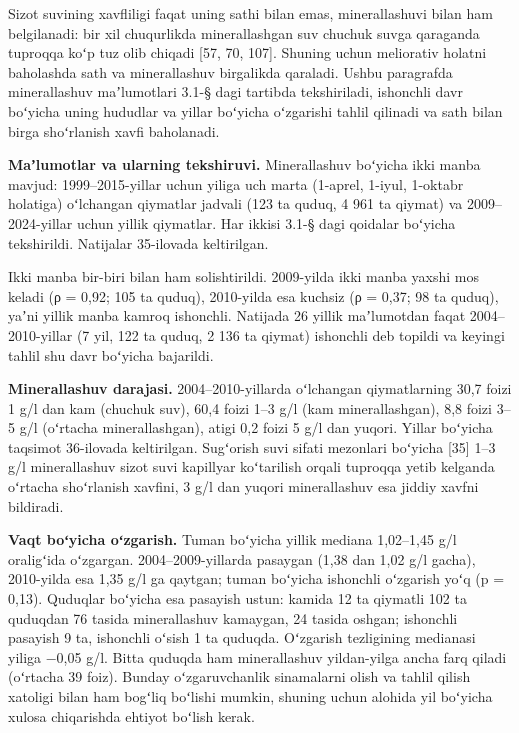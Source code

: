 
Sizot suvining xavfliligi faqat uning sathi bilan emas, minerallashuvi
bilan ham belgilanadi: bir xil chuqurlikda minerallashgan suv chuchuk
suvga qaraganda tuproqqa koʻp tuz olib chiqadi {[}57, 70, 107{]}.
Shuning uchun meliorativ holatni baholashda sath va minerallashuv
birgalikda qaraladi. Ushbu paragrafda minerallashuv maʼlumotlari 3.1-§
dagi tartibda tekshiriladi, ishonchli davr boʻyicha uning hududlar va
yillar boʻyicha oʻzgarishi tahlil qilinadi va sath bilan birga
shoʻrlanish xavfi baholanadi.

\textbf{Maʼlumotlar va ularning tekshiruvi.} Minerallashuv boʻyicha ikki
manba mavjud: 1999--2015-yillar uchun yiliga uch marta (1-aprel, 1-iyul,
1-oktabr holatiga) oʻlchangan qiymatlar jadvali (123 ta quduq, 4 961 ta
qiymat) va 2009--2024-yillar uchun yillik qiymatlar. Har ikkisi 3.1-§
dagi qoidalar boʻyicha tekshirildi. Natijalar 35-ilovada keltirilgan.

Ikki manba bir-biri bilan ham solishtirildi. 2009-yilda ikki manba
yaxshi mos keladi (ρ = 0,92; 105 ta quduq), 2010-yilda esa kuchsiz (ρ =
0,37; 98 ta quduq), yaʼni yillik manba kamroq ishonchli. Natijada 26
yillik maʼlumotdan faqat 2004--2010-yillar (7 yil, 122 ta quduq, 2 136
ta qiymat) ishonchli deb topildi va keyingi tahlil shu davr boʻyicha
bajarildi.

\textbf{Minerallashuv darajasi.} 2004--2010-yillarda oʻlchangan
qiymatlarning 30,7 foizi 1 g/l dan kam (chuchuk suv), 60,4 foizi 1--3
g/l (kam minerallashgan), 8,8 foizi 3--5 g/l (oʻrtacha minerallashgan),
atigi 0,2 foizi 5 g/l dan yuqori. Yillar boʻyicha taqsimot 36-ilovada
keltirilgan. Sugʻorish suvi sifati mezonlari boʻyicha {[}35{]} 1--3 g/l
minerallashuv sizot suvi kapillyar koʻtarilish orqali tuproqqa yetib
kelganda oʻrtacha shoʻrlanish xavfini, 3 g/l dan yuqori minerallashuv
esa jiddiy xavfni bildiradi.

\textbf{Vaqt boʻyicha oʻzgarish.} Tuman boʻyicha yillik mediana
1,02--1,45 g/l oraligʻida oʻzgargan. 2004--2009-yillarda pasaygan (1,38
dan 1,02 g/l gacha), 2010-yilda esa 1,35 g/l ga qaytgan; tuman boʻyicha
ishonchli oʻzgarish yoʻq (p = 0,13). Quduqlar boʻyicha esa pasayish
ustun: kamida 12 ta qiymatli 102 ta quduqdan 76 tasida minerallashuv
kamaygan, 24 tasida oshgan; ishonchli pasayish 9 ta, ishonchli oʻsish 1
ta quduqda. Oʻzgarish tezligining medianasi yiliga −0,05 g/l. Bitta
quduqda ham minerallashuv yildan-yilga ancha farq qiladi (oʻrtacha 39
foiz). Bunday oʻzgaruvchanlik sinamalarni olish va tahlil qilish
xatoligi bilan ham bogʻliq boʻlishi mumkin, shuning uchun alohida yil
boʻyicha xulosa chiqarishda ehtiyot boʻlish kerak.

